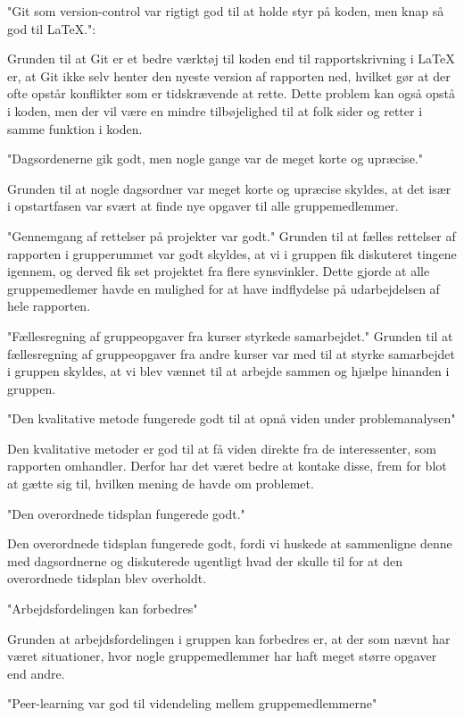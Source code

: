 "Git som version-control var rigtigt god til at holde styr på koden, men knap så god til LaTeX.":

Grunden til at Git er et bedre værktøj til koden end til rapportskrivning i LaTeX er, at Git ikke selv henter den nyeste version af rapporten ned, hvilket gør at der ofte opstår konflikter som er tidskrævende at rette. Dette problem kan også opstå i koden, men der vil være en mindre tilbøjelighed til at folk sider og retter i samme funktion i koden. 

"Dagsordenerne gik godt, men nogle gange var de meget korte og upræcise."

Grunden til at nogle dagsordner var meget korte og upræcise skyldes, at det især i opstartfasen var svært at finde nye opgaver til alle gruppemedlemmer.

"Gennemgang af rettelser på projekter var godt."
Grunden til at fælles rettelser af rapporten i grupperummet var godt skyldes, at vi i gruppen fik diskuteret tingene igennem, og derved fik set projektet fra flere synsvinkler. Dette gjorde at alle gruppemedlemer havde en mulighed for at have indflydelse på udarbejdelsen af hele rapporten. 

"Fællesregning af gruppeopgaver fra kurser styrkede samarbejdet."
Grunden til at fællesregning af gruppeopgaver fra andre kurser var med til at styrke samarbejdet i gruppen skyldes, at vi blev vænnet til at arbejde sammen og hjælpe hinanden i gruppen. 

"Den kvalitative metode fungerede godt til at opnå viden under problemanalysen"

Den kvalitative metoder er god til at få viden direkte fra de interessenter, som rapporten omhandler. Derfor har det været bedre at kontake disse, frem for blot at gætte sig til, hvilken mening de havde om problemet.

"Den overordnede tidsplan fungerede godt."

Den overordnede tidsplan fungerede godt, fordi vi huskede at sammenligne denne med dagsordnerne og diskuterede ugentligt hvad der skulle til for at den overordnede tidsplan blev overholdt. 

"Arbejdsfordelingen kan forbedres"

Grunden at arbejdsfordelingen i gruppen kan forbedres er, at der som nævnt har været situationer, hvor nogle gruppemedlemmer har haft meget større opgaver end andre. 

"Peer-learning var god til videndeling mellem gruppemedlemmerne"

